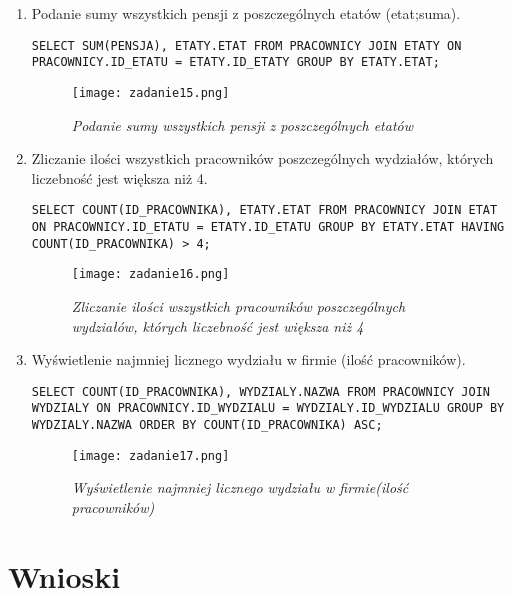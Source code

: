 \documentclass[a4paper, 10pt]{article}
\begin{document}
\begin{enumerate}
\item Podanie sumy wszystkich pensji z poszczególnych etatów (etat;suma).
\begin{lstlisting}[style=SQL, caption=\textit{Podanie sumy wszystkich pensji z poszczególnych etatów}]
SELECT SUM(PENSJA), ETATY.ETAT FROM PRACOWNICY JOIN ETATY ON PRACOWNICY.ID_ETATU = ETATY.ID_ETATY GROUP BY ETATY.ETAT;
\end{lstlisting}

\begin{figure}[H]
	\centering
	\texttt{[image: zadanie15.png]}
	\caption{\textit{Podanie sumy wszystkich pensji z poszczególnych etatów}}
\end{figure}


\item Zliczanie ilości wszystkich pracowników poszczególnych wydziałów, których liczebność jest większa niż 4.  
\begin{lstlisting}[style=SQL, caption=\textit{Zliczanie ilości wszystkich pracowników poszczególnych wydziałów, których liczebność jest większa niż 4}]
SELECT COUNT(ID_PRACOWNIKA), ETATY.ETAT FROM PRACOWNICY JOIN ETAT ON PRACOWNICY.ID_ETATU = ETATY.ID_ETATU GROUP BY ETATY.ETAT HAVING COUNT(ID_PRACOWNIKA) > 4;
\end{lstlisting}

\begin{figure}[H]
	\centering
	\texttt{[image: zadanie16.png]}
	\caption{\textit{Zliczanie ilości wszystkich pracowników poszczególnych wydziałów, których liczebność jest większa niż 4}}
\end{figure}


\item Wyświetlenie najmniej licznego wydziału w firmie (ilość pracowników).
\begin{lstlisting}[style=SQL, caption=\textit{Wyświetlenie najmniej licznego wydziału w firmie(ilość pracowników)}]
SELECT COUNT(ID_PRACOWNIKA), WYDZIALY.NAZWA FROM PRACOWNICY JOIN WYDZIALY ON PRACOWNICY.ID_WYDZIALU = WYDZIALY.ID_WYDZIALU GROUP BY WYDZIALY.NAZWA ORDER BY COUNT(ID_PRACOWNIKA) ASC;
\end{lstlisting}

%
%

\begin{figure}[H]
	\centering
	\texttt{[image: zadanie17.png]}
	\caption{\textit{Wyświetlenie najmniej licznego wydziału w firmie(ilość pracowników)}}
\end{figure}
\end{enumerate}


\section{Wnioski}
\end{document}
